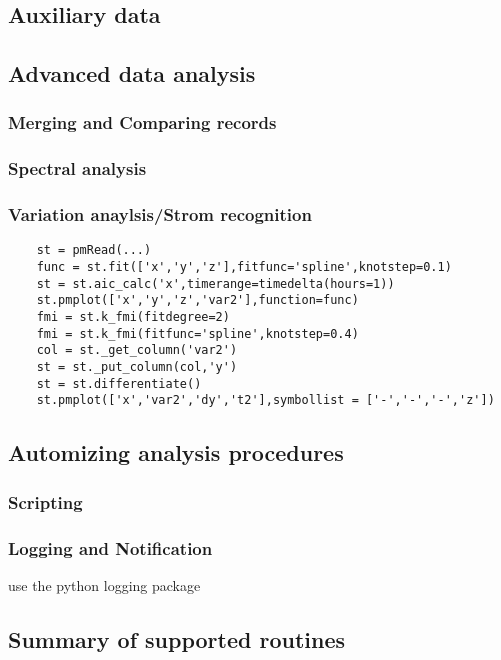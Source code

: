 \subsection{Auxiliary data}


\subsection{Advanced data analysis}

\subsubsection{Merging and Comparing records}

\subsubsection{Spectral analysis}

\subsubsection{Variation anaylsis/Strom recognition}

\begin{verbatim}
    st = pmRead(...)
    func = st.fit(['x','y','z'],fitfunc='spline',knotstep=0.1)
    st = st.aic_calc('x',timerange=timedelta(hours=1))
    st.pmplot(['x','y','z','var2'],function=func)
    fmi = st.k_fmi(fitdegree=2)
    fmi = st.k_fmi(fitfunc='spline',knotstep=0.4)
    col = st._get_column('var2')
    st = st._put_column(col,'y')
    st = st.differentiate()
    st.pmplot(['x','var2','dy','t2'],symbollist = ['-','-','-','z'])
\end{verbatim}


\subsection{Automizing analysis procedures}

\subsubsection{Scripting}

\subsubsection{Logging and Notification}

use the python logging package

\subsection{Summary of supported routines}

